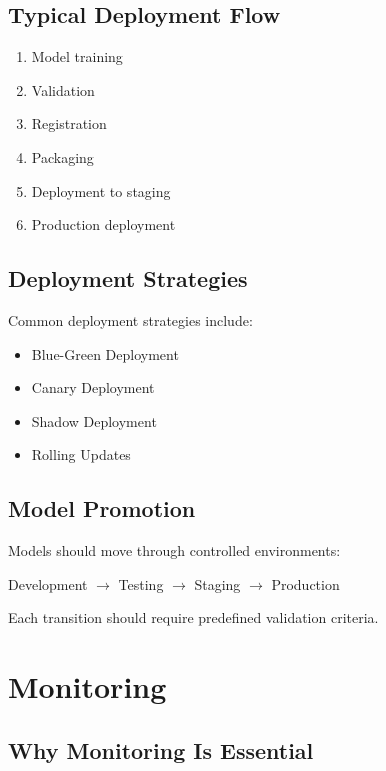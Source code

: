 \subsection{Typical Deployment Flow}

\begin{enumerate}
    \item Model training
    \item Validation
    \item Registration
    \item Packaging
    \item Deployment to staging
    \item Production deployment
\end{enumerate}

\subsection{Deployment Strategies}

Common deployment strategies include:

\begin{itemize}
    \item Blue-Green Deployment
    \item Canary Deployment
    \item Shadow Deployment
    \item Rolling Updates
\end{itemize}

\subsection{Model Promotion}

Models should move through controlled environments:

\begin{center}
Development $\rightarrow$ Testing $\rightarrow$ Staging $\rightarrow$ Production
\end{center}

Each transition should require predefined validation criteria.

\section{Monitoring}

\subsection{Why Monitoring Is Essential}


